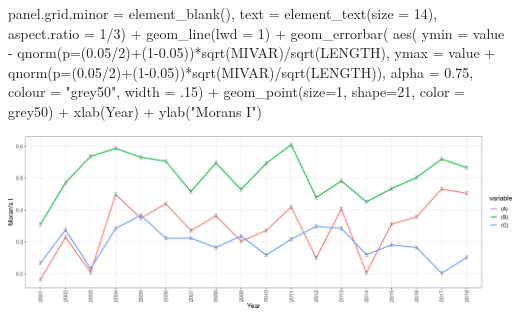 \documentclass[10pt,landscape,a3paper]{article}
\newenvironment{Shaded}{\begin{snugshade}}{\end{snugshade}}
\newcommand{\AttributeTok}[1]{\textcolor[rgb]{0.77,0.63,0.00}{#1}}
\newcommand{\DecValTok}[1]{\textcolor[rgb]{0.00,0.00,0.81}{#1}}
\newcommand{\FloatTok}[1]{\textcolor[rgb]{0.00,0.00,0.81}{#1}}
\newcommand{\FunctionTok}[1]{\textcolor[rgb]{0.00,0.00,0.00}{#1}}
\newcommand{\NormalTok}[1]{#1}
\newcommand{\SpecialCharTok}[1]{\textcolor[rgb]{0.00,0.00,0.00}{#1}}
\newcommand{\StringTok}[1]{\textcolor[rgb]{0.31,0.60,0.02}{#1}}
\begin{document}
\begin{Shaded}
\begin{Highlighting}[]
    \AttributeTok{panel.grid.minor =} \FunctionTok{element\_blank}\NormalTok{(),}
    \AttributeTok{text =} \FunctionTok{element\_text}\NormalTok{(}\AttributeTok{size =} \DecValTok{14}\NormalTok{), }\AttributeTok{aspect.ratio =} \DecValTok{1}\SpecialCharTok{/}\DecValTok{3}\NormalTok{) }\SpecialCharTok{+}
  \FunctionTok{geom\_line}\NormalTok{(}\AttributeTok{lwd =} \DecValTok{1}\NormalTok{) }\SpecialCharTok{+}
  \FunctionTok{geom\_errorbar}\NormalTok{(}
    \FunctionTok{aes}\NormalTok{(}
      \AttributeTok{ymin =}\NormalTok{ value }\SpecialCharTok{{-}} \FunctionTok{qnorm}\NormalTok{(}\AttributeTok{p=}\NormalTok{(}\FloatTok{0.05}\SpecialCharTok{/}\DecValTok{2}\NormalTok{)}\SpecialCharTok{+}\NormalTok{(}\DecValTok{1}\FloatTok{{-}0.05}\NormalTok{))}\SpecialCharTok{*}\FunctionTok{sqrt}\NormalTok{(MIVAR)}\SpecialCharTok{/}\FunctionTok{sqrt}\NormalTok{(LENGTH),}
      \AttributeTok{ymax =}\NormalTok{ value }\SpecialCharTok{+} \FunctionTok{qnorm}\NormalTok{(}\AttributeTok{p=}\NormalTok{(}\FloatTok{0.05}\SpecialCharTok{/}\DecValTok{2}\NormalTok{)}\SpecialCharTok{+}\NormalTok{(}\DecValTok{1}\FloatTok{{-}0.05}\NormalTok{))}\SpecialCharTok{*}\FunctionTok{sqrt}\NormalTok{(MIVAR)}\SpecialCharTok{/}\FunctionTok{sqrt}\NormalTok{(LENGTH)),}
    \AttributeTok{alpha =} \FloatTok{0.75}\NormalTok{,}
    \AttributeTok{colour =} \StringTok{"grey50"}\NormalTok{,}
    \AttributeTok{width =}\NormalTok{ .}\DecValTok{15}\NormalTok{) }\SpecialCharTok{+}
  \FunctionTok{geom\_point}\NormalTok{(}\AttributeTok{size=}\DecValTok{1}\NormalTok{, }\AttributeTok{shape=}\DecValTok{21}\NormalTok{, }\AttributeTok{color =} \StringTok{\textquotesingle{}grey50\textquotesingle{}}\NormalTok{) }\SpecialCharTok{+} 
  \FunctionTok{xlab}\NormalTok{(}\StringTok{\textquotesingle{}Year\textquotesingle{}}\NormalTok{) }\SpecialCharTok{+}
  \FunctionTok{ylab}\NormalTok{(}\StringTok{"Moran\textquotesingle{}s I"}\NormalTok{)}
\end{Highlighting}
\end{Shaded}

\begin{center}\includegraphics{img/modelling/transformations-3} \end{center}
\end{document}
